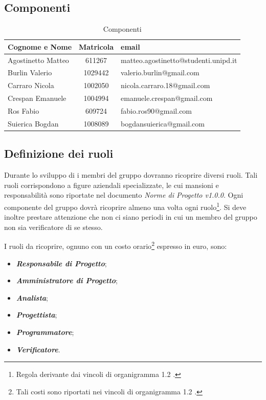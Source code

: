 \subsection{Componenti}

\begin{table}[h]
	\centering
	\begin{tabular}{|l|c|l|}
		\toprule
		\textbf{Cognome e Nome} & \textbf{Matricola} & \textbf{email} \\
	
		\midrule
		Agostinetto Matteo & 611267 & matteo.agostinetto@studenti.unipd.it \\
		Burlin Valerio & 1029442 & valerio.burlin@gmail.com \\ 
		Carraro Nicola & 1002050 & nicola.carraro.18@gmail.com \\
		Crespan Emanuele & 1004994 & emanuele.crespan@gmail.com \\
		Ros Fabio & 609724 & fabio.ros90@gmail.com \\
		Suierica Bogdan & 1008089 & bogdansuierica@gmail.com \\
		
		\bottomrule
	\end{tabular}
	\caption{Componenti}
\end{table}

\subsection{Definizione dei ruoli}
Durante lo sviluppo di \PROGETTO{} i membri del gruppo dovranno ricoprire diversi ruoli. Tali ruoli corrispondono a figure aziendali specializzate, le cui mansioni e responsabilità sono riportate nel documento \textit{Norme di Progetto v1.0.0}. Ogni componente del gruppo dovrà ricoprire almeno una volta ogni ruolo\footnote{Regola derivante dai vincoli di organigramma 1.2 .}. Si deve inoltre prestare attenzione che non ci siano periodi in cui un membro del gruppo non sia verificatore di se stesso.

\noindent I ruoli da ricoprire, ognuno con un costo orario\footnote{Tali costi sono riportati nei vincoli di organigramma 1.2 .} espresso in euro, sono: 
\begin{itemize}
	\item \textbf{\textit{Responsabile di Progetto}};
	\item \textbf{\textit{Amministratore di Progetto}};
	\item \textbf{\textit{Analista}};
	\item \textbf{\textit{Progettista}};
	\item \textbf{\textit{Programmatore}};
	\item \textbf{\textit{Verificatore}}.	
\end{itemize}


